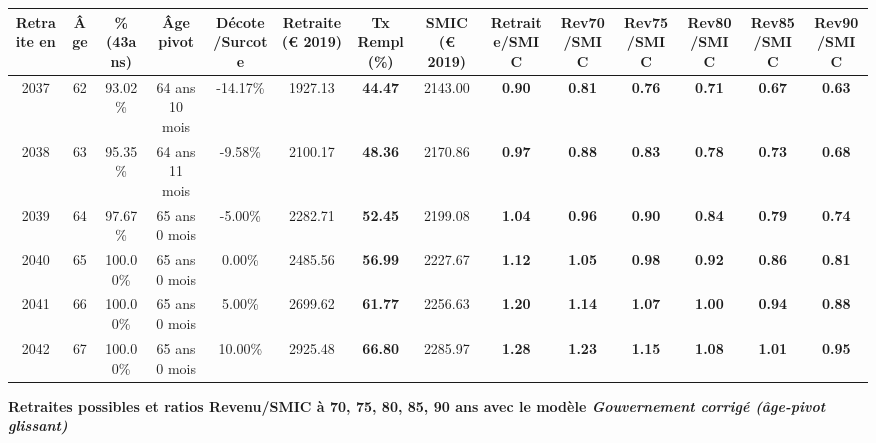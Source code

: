 \begin{adjustbox}{max width=\textwidth} 
\begin{tabular}[htb]{|c|c||c|c|c||c|c||c||c|c|c|c|c|c|} 
\hline 
 Retraite en &  Âge &  \%(43ans) &  Âge pivot &  Décote/Surcote &  Retraite (\euro{} 2019) &  Tx Rempl(\%) &  SMIC (\euro{} 2019) &  Retraite/SMIC &  Rev70/SMIC &  Rev75/SMIC &  Rev80/SMIC &  Rev85/SMIC &  Rev90/SMIC \\ 
\hline \hline 
 2037 &  62 &  93.02\% &  64 ans 10 mois &  -14.17\% &  1927.13 &  {\bf 44.47} &  2143.00 &  {\bf {\color{red} 0.90}} &  {\bf {\color{red} 0.81}} &  {\bf {\color{red} 0.76}} &  {\bf {\color{red} 0.71}} &  {\bf {\color{red} 0.67}} &  {\bf {\color{red} 0.63}} \\ 
\hline 
 2038 &  63 &  95.35\% &  64 ans 11 mois &  -9.58\% &  2100.17 &  {\bf 48.36} &  2170.86 &  {\bf {\color{red} 0.97}} &  {\bf {\color{red} 0.88}} &  {\bf {\color{red} 0.83}} &  {\bf {\color{red} 0.78}} &  {\bf {\color{red} 0.73}} &  {\bf {\color{red} 0.68}} \\ 
\hline 
 2039 &  64 &  97.67\% &  65 ans 0 mois &  -5.00\% &  2282.71 &  {\bf 52.45} &  2199.08 &  {\bf 1.04} &  {\bf {\color{red} 0.96}} &  {\bf {\color{red} 0.90}} &  {\bf {\color{red} 0.84}} &  {\bf {\color{red} 0.79}} &  {\bf {\color{red} 0.74}} \\ 
\hline 
 2040 &  65 &  100.00\% &  65 ans 0 mois &  0.00\% &  2485.56 &  {\bf 56.99} &  2227.67 &  {\bf 1.12} &  {\bf 1.05} &  {\bf {\color{red} 0.98}} &  {\bf {\color{red} 0.92}} &  {\bf {\color{red} 0.86}} &  {\bf {\color{red} 0.81}} \\ 
\hline 
 2041 &  66 &  100.00\% &  65 ans 0 mois &  5.00\% &  2699.62 &  {\bf 61.77} &  2256.63 &  {\bf 1.20} &  {\bf 1.14} &  {\bf 1.07} &  {\bf {\color{red} 1.00}} &  {\bf {\color{red} 0.94}} &  {\bf {\color{red} 0.88}} \\ 
\hline 
 2042 &  67 &  100.00\% &  65 ans 0 mois &  10.00\% &  2925.48 &  {\bf 66.80} &  2285.97 &  {\bf 1.28} &  {\bf 1.23} &  {\bf 1.15} &  {\bf 1.08} &  {\bf 1.01} &  {\bf {\color{red} 0.95}} \\ 
\hline 
\hline 
\end{tabular} 
\end{adjustbox} 
 
 \vspace{0.1cm} 
{\bf \noindent Retraites possibles et ratios Revenu/SMIC à 70, 75, 80, 85, 90 ans avec le modèle \emph{Gouvernement corrigé (âge-pivot glissant)}}  
 
